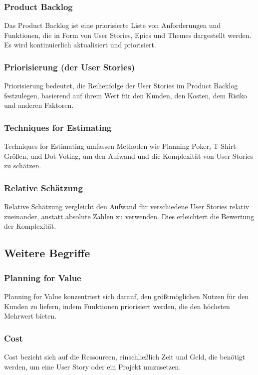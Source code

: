 \subsubsection{Product Backlog}
Das Product Backlog ist eine priorisierte Liste von Anforderungen und Funktionen, die in Form von User Stories, Epics und Themes dargestellt werden. Es wird kontinuierlich aktualisiert und priorisiert.

\subsubsection{Priorisierung (der User Stories)}
Priorisierung bedeutet, die Reihenfolge der User Stories im Product Backlog festzulegen, basierend auf ihrem Wert für den Kunden, den Kosten, dem Risiko und anderen Faktoren.

\subsubsection{Techniques for Estimating}
Techniques for Estimating umfassen Methoden wie Planning Poker, T-Shirt-Größen, und Dot-Voting, um den Aufwand und die Komplexität von User Stories zu schätzen.

\subsubsection{Relative Schätzung}
Relative Schätzung vergleicht den Aufwand für verschiedene User Stories relativ zueinander, anstatt absolute Zahlen zu verwenden. Dies erleichtert die Bewertung der Komplexität.

\subsection{Weitere Begriffe}

\subsubsection{Planning for Value}
Planning for Value konzentriert sich darauf, den größtmöglichen Nutzen für den Kunden zu liefern, indem Funktionen priorisiert werden, die den höchsten Mehrwert bieten.

\subsubsection{Cost}
Cost bezieht sich auf die Ressourcen, einschließlich Zeit und Geld, die benötigt werden, um eine User Story oder ein Projekt umzusetzen.

